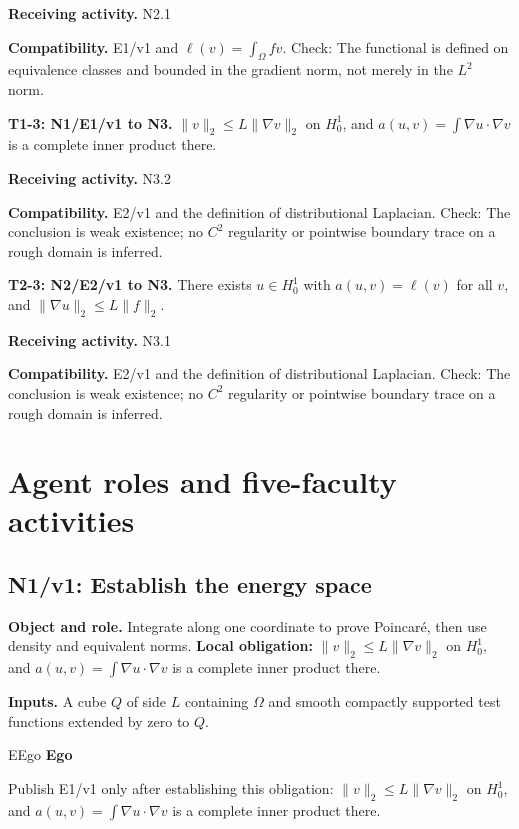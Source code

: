 \documentclass[preprint,12pt,aps,pra,showkeys,amsmath,amssymb,superscriptaddress,floatfix]{revtex4-2}
\theoremstyle{definition}
\theoremstyle{remark}
\newcommand{\mmfaculty}[3]{%
 \begin{mmfacultybox}{#1}{#2}
 {\sffamily\bfseries\color{MMBlue}#2}\par\smallskip #3
 \end{mmfacultybox}}
\newcommand{\field}[2]{\par\smallskip\noindent\textbf{#1.} #2\par}
\begin{document}
\field{Receiving activity}{N2.1}

\field{Compatibility}{E1/v1 and \(\ell(v)=\int_\Omega fv\). Check: The functional is defined
on equivalence classes and bounded in the gradient norm, not merely in
the \(L^2\) norm.}

\field{T1-3: N1/E1/v1 to N3}{\(\|v\|_2\le L\|\nabla v\|_2\) on \(H_0^1\), and
\(a(u,v)=\int\nabla u\cdot\nabla v\) is a complete inner product there.}

\field{Receiving activity}{N3.2}

\field{Compatibility}{E2/v1 and the definition of distributional Laplacian. Check: The
conclusion is weak existence; no \(C^2\) regularity or pointwise
boundary trace on a rough domain is inferred.}

\field{T2-3: N2/E2/v1 to N3}{There exists \(u\in H_0^1\) with \(a(u,v)=\ell(v)\) for all \(v\), and
\(\|\nabla u\|_2\le L\|f\|_2\).}

\field{Receiving activity}{N3.1}

\field{Compatibility}{E2/v1 and the definition of distributional Laplacian. Check: The
conclusion is weak existence; no \(C^2\) regularity or pointwise
boundary trace on a rough domain is inferred.}

\endgroup

\clearpage\section{Agent roles and five-faculty activities}\begingroup\small\linespread{1.05}\selectfont{}

\subsection{N1/v1: Establish the energy space}

\field{Object and role}{Integrate along one coordinate to prove Poincaré, then use density and
equivalent norms. \textbf{Local obligation:}
\(\|v\|_2\le L\|\nabla v\|_2\) on \(H_0^1\), and
\(a(u,v)=\int\nabla u\cdot\nabla v\) is a complete inner product there.}

\field{Inputs}{A cube \(Q\) of side \(L\) containing \(\Omega\) and smooth compactly
supported test functions extended by zero to \(Q\).}

\mmfaculty{E}{Ego}{Publish E1/v1 only after establishing this obligation:
\(\|v\|_2\le L\|\nabla v\|_2\) on \(H_0^1\), and
\(a(u,v)=\int\nabla u\cdot\nabla v\) is a complete inner product there.}
\end{document}
